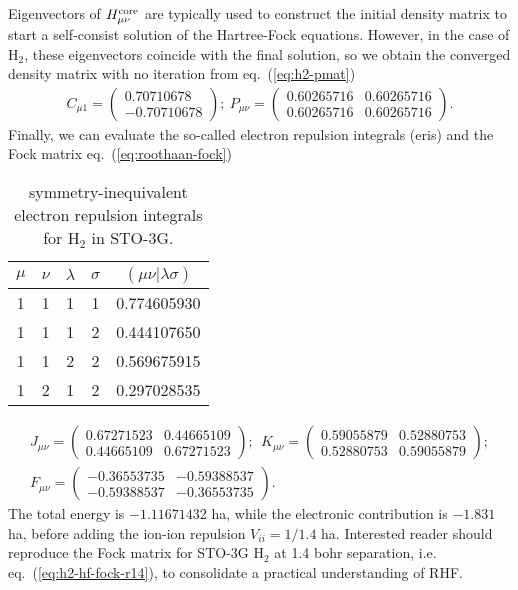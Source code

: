 Eigenvectors of $H^{\text{core}}_{\mu\nu}$ are typically used to construct the initial density matrix to start a self-consist solution of the Hartree-Fock equations. However, in the case of H$_2$, these eigenvectors coincide with the final solution, so we obtain the converged density matrix with no iteration from eq.~(\ref{eq:h2-pmat})
\begin{align}
C_{\mu 1} = \left(\begin{array}{c}
0.70710678 \\ -0.70710678
\end{array}\right);
~P_{\mu\nu} = \left(\begin{array}{cc}
0.60265716 & 0.60265716 \\
0.60265716 & 0.60265716
\end{array}\right).
\end{align}
Finally, we can evaluate the so-called electron repulsion integrals (eris) and the Fock matrix eq.~(\ref{eq:roothaan-fock})
\begin{table}[h]
\centering
\caption{symmetry-inequivalent electron repulsion integrals for H$_2$ in STO-3G.}
\begin{tabular}{ccccc}
\toprule
$\mu$ & $\nu$ & $\lambda$ & $\sigma$ & $(\mu\nu|\lambda\sigma)$\\
\midrule
1 & 1 & 1 & 1 & 0.774605930 \\
1 & 1 & 1 & 2 & 0.444107650 \\
1 & 1 & 2 & 2 & 0.569675915 \\
1 & 2 & 1 & 2 & 0.297028535 \\
\bottomrule
\end{tabular}
\end{table}
\begin{align}
J_{\mu\nu} = \left(\begin{array}{cc}
0.67271523 & 0.44665109 \\
0.44665109 & 0.67271523
\end{array}\right); ~~
K_{\mu\nu} = \left(\begin{array}{cc}
0.59055879 & 0.52880753 \\
0.52880753 & 0.59055879
\end{array}\right);\\
F_{\mu\nu} = \left(\begin{array}{cc}
-0.36553735 & -0.59388537 \\
-0.59388537 & -0.36553735
\end{array}\right).\label{eq:h2-hf-fock-r14}
\end{align}
The total energy is $-1.11671432$ ha, while the electronic contribution is $-1.831$ ha, before adding the ion-ion repulsion $V_{ii}=1/1.4$ ha. Interested reader should reproduce the Fock matrix for STO-3G H$_2$ at 1.4 bohr separation, i.e. eq.~(\ref{eq:h2-hf-fock-r14}), to consolidate a practical understanding of RHF.

